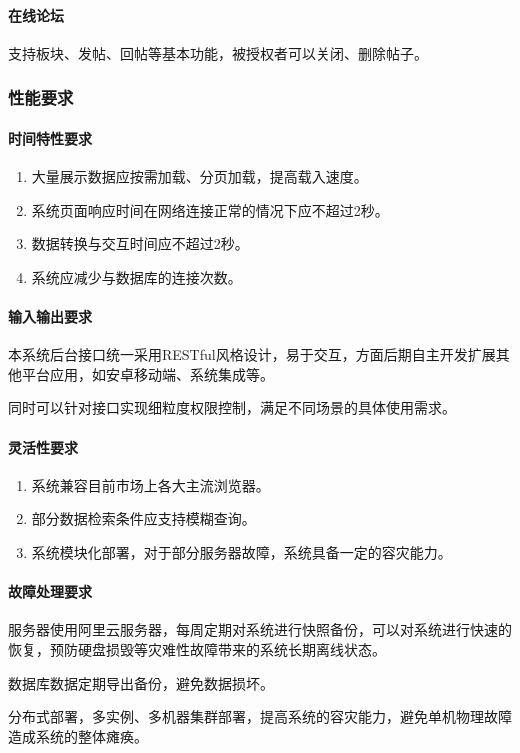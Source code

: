 \documentclass[titlepage,UTF8,linespread=1.5]{ctexart}
\begin{document}
\paragraph{在线论坛}
支持板块、发帖、回帖等基本功能，被授权者可以关闭、删除帖子。\par

\subsubsection{性能要求}
\paragraph{时间特性要求}
\begin{enumerate}
    \item 大量展示数据应按需加载、分页加载，提高载入速度。
    \item 系统页面响应时间在网络连接正常的情况下应不超过2秒。
    \item 数据转换与交互时间应不超过2秒。
    \item 系统应减少与数据库的连接次数。
\end{enumerate}

\paragraph{输入输出要求}
本系统后台接口统一采用RESTful风格设计，易于交互，方面后期自主开发扩展其他平台应用，如安卓移动端、系统集成等。\par
同时可以针对接口实现细粒度权限控制，满足不同场景的具体使用需求。\par

\paragraph{灵活性要求}
\begin{enumerate}
    \item 系统兼容目前市场上各大主流浏览器。
    \item 部分数据检索条件应支持模糊查询。
    \item 系统模块化部署，对于部分服务器故障，系统具备一定的容灾能力。
\end{enumerate}

\paragraph{故障处理要求}
服务器使用阿里云服务器，每周定期对系统进行快照备份，可以对系统进行快速的恢复，预防硬盘损毁等灾难性故障带来的系统长期离线状态。\par
数据库数据定期导出备份，避免数据损坏。\par
分布式部署，多实例、多机器集群部署，提高系统的容灾能力，避免单机物理故障造成系统的整体瘫痪。\par
\end{document}
